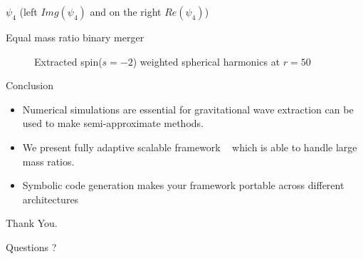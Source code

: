 \documentclass[16pt,xcolor=table]{beamer}
\begin{document}
\begin{frame}{$\psi_4$ (left $Img(\psi_4)$ and on the right $Re(\psi_4)$) }

\fboxsep=0pt
\fboxrule=0pt
\noindent{}%
\hfill%

\end{frame}



\begin{frame}{Equal mass ratio binary merger}
\begin{figure}
\centering
{}
\caption{Extracted spin($s=-2$) weighted spherical harmonics at $r=50$}
\label{fig::psi_4}

\end{figure}
\end{frame}



\begin{frame}{Conclusion}
	\begin{itemize}
		\item Numerical simulations are essential for gravitational wave extraction can be used to make semi-approximate methods. 
		\item We present fully adaptive scalable framework \dendrogr~ which is able to handle large mass ratios. 
		\item Symbolic code generation makes your framework portable across different architectures
	\end{itemize}
\end{frame}


\begin{frame}
\begin{center}
	\Huge Thank You. 
\end{center}
	
\end{frame}


\begin{frame}
\begin{center}
	\Huge Questions ?
\end{center}

\end{frame}
	
\end{document}
